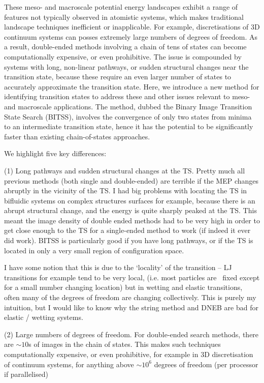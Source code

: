 \documentclass[aps,twocolumn]{revtex4}
\begin{document}
These meso- and macroscale potential energy landscapes exhibit a range of features not typically observed in atomistic systems, which makes traditional landscape techniques inefficient or inapplicable. For example, discretisations of 3D continuum systems can posses extremely large numbers of degrees of freedom. As a result, double-ended methods involving a chain of tens of states can become computationally expensive, or even prohibitive. The issue is compounded by systems with long, non-linear pathways, or sudden structural changes near the transition state, because these require an even larger number of states to accurately approximate the transition state. Here, we introduce a new method for identifying transition states to address these and other issues relevant to meso- and macroscale applications. The method, dubbed the Binary Image Transition State Search (BITSS), involves the convergence of only two states from minima to an intermediate transition state, hence it has the potential to be significantly faster than existing chain-of-states approaches.

We highlight five key differences:

(1) Long pathways and sudden structural changes at the TS. Pretty much all previous methods (both single and double-ended) are terrible if the MEP changes abruptly in the vicinity of the TS. I had big problems with locating the TS in bifluidic systems on complex structures surfaces for example, because there is an abrupt structural change, and the energy is quite sharply peaked at the TS. This meant the image density of double ended methods had to be very high in order to get close enough to the TS for a single-ended method to work (if indeed it ever did work). BITSS is particularly good if you have long pathways, or if the TS is located in only a very small region of configuration space.

I have some notion that this is due to the ‘locality’ of the transition – LJ transitions for example tend to be very local, (i.e. most particles are ~fixed except for a small number changing location) but in wetting and elastic transitions, often many of the degrees of freedom are changing collectively. This is purely my intuition, but I would like to know why the string method and DNEB are bad for elastic / wetting systems.

(2) Large numbers of degrees of freedom. For double-ended search methods, there are $\sim10$s of images in the chain of states. This makes such techniques computationally expensive, or even prohibitive, for example in 3D discretisation of continuum systems, for anything above $\sim10^6$ degrees of freedom (per processor if parallelised)
\end{document}
